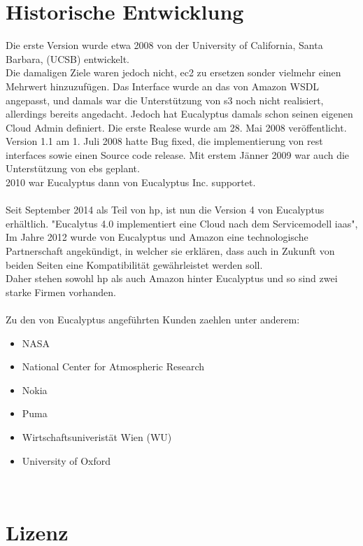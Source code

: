 \documentclass[a4paper,nochapterprefix,english,12pt]{scrreprt}
\begin{document}
\section{Historische Entwicklung}
Die erste Version wurde etwa 2008 von der University of California, Santa Barbara, (UCSB) entwickelt. \\
Die damaligen Ziele waren jedoch nicht, \gls{ec2} zu ersetzen sonder vielmehr einen Mehrwert hinzuzufügen.
Das Interface wurde an das von Amazon WSDL angepasst, und damals war die Unterstützung von \gls{s3} noch nicht realisiert, allerdings bereits angedacht. Jedoch hat Eucalyptus damals schon seinen eigenen Cloud Admin definiert. Die erste Realese wurde am 28. Mai 2008 veröffentlicht. \\
Version 1.1 am 1. Juli 2008 hatte Bug fixed, die implementierung von \gls{rest} interfaces sowie einen Source code release. Mit erstem Jänner 2009 war auch die Unterstützung von \gls{ebs} geplant. 
\cite{EucalyptusSlideShare} \\
2010 war Eucalyptus dann von Eucalyptus Inc. supportet. \cite{Eucalyptus2010}
\\ \\
Seit September 2014 als Teil von \gls{hp}, ist nun die Version 4 von Eucalyptus erhältlich. "Eucalytus 4.0 implementiert eine Cloud nach dem Servicemodell \gls{iaas}", \cite{EucalyptusV4}\\
Im Jahre 2012 wurde von Eucalyptus und Amazon eine technologische Partnerschaft angekündigt, in welcher sie erklären, dass auch in Zukunft von beiden Seiten eine Kompatibilität gewährleistet werden soll.\cite{EucalyptusAWSPart} \\
Daher stehen sowohl \gls{hp} als auch Amazon hinter Eucalyptus und so sind zwei starke Firmen vorhanden.\\
\\
\newpage
Zu den von Eucalyptus angeführten Kunden zaehlen unter anderem:
\begin{itemize}
\item NASA
\item National Center for Atmospheric Research 
\item Nokia
\item Puma
\item Wirtschaftsuniveristät Wien (WU)
\item University of Oxford
\end{itemize}
\cite{EucalyptusCustomers} \\
\section{Lizenz}
\end{document}
